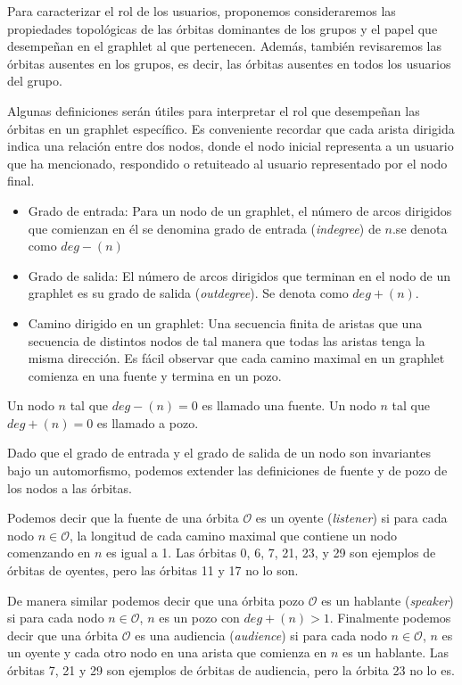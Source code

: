 Para caracterizar el rol de los usuarios, proponemos consideraremos las propiedades topológicas de las órbitas dominantes de los grupos y el papel que desempeñan en el graphlet al que pertenecen. Además, también revisaremos las órbitas ausentes en los grupos, es decir, las órbitas ausentes en todos los usuarios del grupo.

Algunas definiciones serán útiles para interpretar el rol que desempeñan las órbitas en un graphlet específico. Es conveniente recordar que cada arista dirigida indica una relación entre dos nodos, donde el nodo inicial representa a un usuario que ha mencionado, respondido o retuiteado al usuario representado por el nodo final. 

\begin{itemize}
    \item Grado de entrada: Para un nodo de un graphlet, el número de arcos dirigidos que comienzan en él se denomina grado de entrada (\textit{indegree}) de $n$.se denota como $deg-(n)$
    \item Grado de salida: El número de arcos dirigidos que terminan en el nodo de un graphlet es su grado de salida (\textit{outdegree}). Se denota como $deg+(n)$.
    \item Camino dirigido en un graphlet: Una secuencia finita de aristas que una secuencia de distintos nodos de tal manera que todas las aristas tenga la misma dirección. Es fácil observar que cada camino maximal en un graphlet comienza en una fuente y termina en un pozo. %
\end{itemize}

Un nodo $n$ tal que $deg-(n)=0$ es llamado una fuente. Un nodo $n$ tal que $deg+(n)=0$ es llamado a pozo. 

Dado que el grado de entrada y el grado de salida de un nodo son invariantes bajo un automorfismo, podemos extender las definiciones de fuente y de pozo de los nodos a las órbitas. 

Podemos decir que la fuente de una órbita $\mathcal{O}$ es un oyente (\emph{listener}) si para cada nodo $n\in\mathcal{O}$, la longitud de cada camino maximal que contiene un nodo comenzando en $n$ es igual a 1. Las órbitas 0, 6, 7, 21, 23, y 29 son ejemplos de órbitas de oyentes, pero las órbitas 11 y 17 no lo son. 

De manera similar podemos decir que una órbita pozo $\mathcal{O}$ es un hablante (\emph{speaker}) si para cada nodo  $n\in\mathcal{O}$, $n$ es un pozo con $deg+(n)>1$. Finalmente podemos decir que una órbita $\mathcal{O}$ es una audiencia (\emph{audience}) si para cada nodo $n\in\mathcal{O}$, $n$ es un oyente y cada otro nodo en una arista que comienza en $n$ es un hablante. Las órbitas 7, 21 y 29 son ejemplos de órbitas de audiencia, pero la órbita 23 no lo es. 


